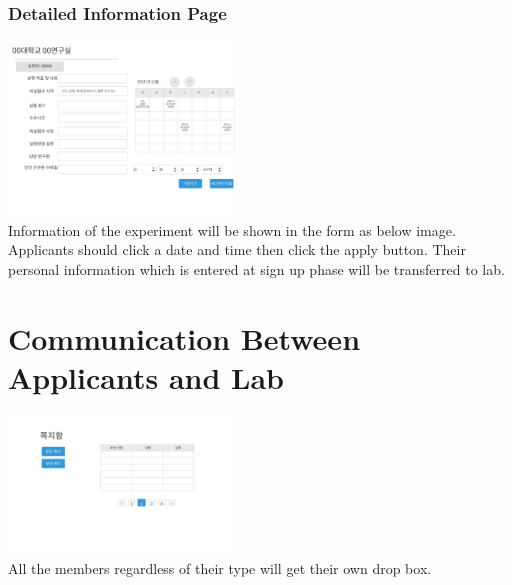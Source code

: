 \documentclass[letterpaper, 10 pt, conference]{ieeeconf}  %
\begin{document}
\subsubsection{Detailed Information Page}
\includegraphics[width=6cm]{Oven/12_detailedExperiment.jpg}
\\Information of the experiment will be shown in the form as below image. Applicants should click a date and time then click the apply button. Their personal information which is entered at sign up phase will be transferred to lab. 

\section{Communication Between Applicants and Lab}
\includegraphics[width=6cm]{Oven/13_dropbox.jpg}
\\All the members regardless of their type will get their own drop box.
\addtolength{\textheight}{-12cm}   %











\end{document}
